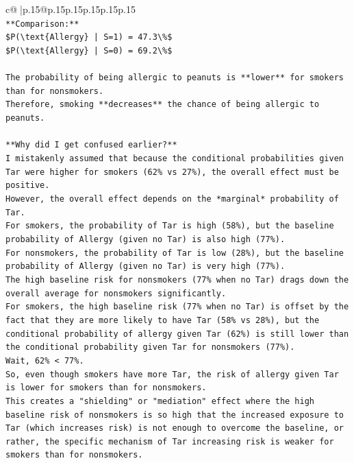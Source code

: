 \documentclass{article}
\begin{document}
{\begin{supertabular}{c@{$\;$}|p{.15\linewidth}@{}p{.15\linewidth}p{.15\linewidth}p{.15\linewidth}p{.15\linewidth}p{.15\linewidth}}
{{{\\ 
\texttt{**Comparison:**} \\
\texttt{\$P(\textbackslash{}text\{Allergy\} | S=1) = 47.3\textbackslash{}\%\$} \\
\texttt{\$P(\textbackslash{}text\{Allergy\} | S=0) = 69.2\textbackslash{}\%\$} \\
\\ 
\texttt{The probability of being allergic to peanuts is **lower** for smokers than for nonsmokers.} \\
\texttt{Therefore, smoking **decreases** the chance of being allergic to peanuts.} \\
\\ 
\texttt{**Why did I get confused earlier?**} \\
\texttt{I mistakenly assumed that because the conditional probabilities given Tar were higher for smokers (62\% vs 27\%), the overall effect must be positive.} \\
\texttt{However, the overall effect depends on the *marginal* probability of Tar.} \\
\texttt{For smokers, the probability of Tar is high (58\%), but the baseline probability of Allergy (given no Tar) is also high (77\%).} \\
\texttt{For nonsmokers, the probability of Tar is low (28\%), but the baseline probability of Allergy (given no Tar) is very high (77\%).} \\
\texttt{The high baseline risk for nonsmokers (77\% when no Tar) drags down the overall average for nonsmokers significantly.} \\
\texttt{For smokers, the high baseline risk (77\% when no Tar) is offset by the fact that they are more likely to have Tar (58\% vs 28\%), but the conditional probability of allergy given Tar (62\%) is still lower than the conditional probability given Tar for nonsmokers (77\%).} \\
\texttt{Wait, 62\% < 77\%.} \\
\texttt{So, even though smokers have more Tar, the risk of allergy given Tar is lower for smokers than for nonsmokers.} \\
\texttt{This creates a "shielding" or "mediation" effect where the high baseline risk of nonsmokers is so high that the increased exposure to Tar (which increases risk) is not enough to overcome the baseline, or rather, the specific mechanism of Tar increasing risk is weaker for smokers than for nonsmokers.} \\
\\ 
}}}
\end{supertabular}}
\end{document}
